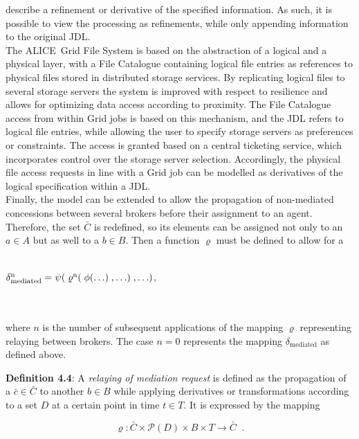 \documentclass[10pt]{iopart}
\newcommand{\alice}{ALICE}
\begin{document}
describe a refinement or derivative of the specified information. As such, it is
possible to view the processing as refinements, while only appending
information to the original JDL.\\
The \alice\ Grid File System is based on the abstraction of a
logical and a physical layer, with a File Catalogue containing
logical file entries as references to physical files stored in
distributed storage services. By replicating logical files to several 
storage servers the system is
improved with respect to resilience and allows for optimizing data access
according to
proximity. The
File Catalogue access from within Grid jobs is based on this mechanism, and the 
JDL refers to logical file entries,
while allowing the user to specify storage servers as preferences or
constraints. The access is granted based on a central ticketing service, which 
incorporates control over the storage server selection. Accordingly, the
physical file access requests in line with a Grid job can be modelled as
derivatives of the logical specification within a JDL.\\
Finally, the model can be extended to allow the propagation of
non-mediated concessions between several brokers before their assignment to an agent.
Therefore, the set $\bar{C}$ is
redefined, so its elements can be assigned not only to an $a \in A$  but as
well to a $b \in B$. Then a function $\varrho$ must be defined to
allow for a\\\\
\centerline{$\delta\rm{^n_{mediated}} =
\psi(\;\varrho^n(\;\phi(\ldots)\;,\ldots)\;,\ldots)$\;\;,}\\\\
where $n$ is the
number of subsequent applications of the mapping
$\varrho$ representing relaying between brokers. The case $n=0$ represents the
mapping $\delta_{\text{mediated}}$  as defined above.\\
\par
\begingroup
\leftskip=0.4cm \noindent
\textbf{Definition 4.4}: A \textit{relaying of mediation request} is defined as
the propagation of a $\bar{c} \in \bar{C}$ to another $ b \in B$ while applying
derivatives or transformations according to a set $D$ at a certain point in time
$t \in T$. It is expressed by the mapping
\par
\endgroup\noindent
\begin{center}
\begin{equation}\tag{f 4.4}\label{relay}\varrho: \bar{C}
\times \mathcal{P}(D) \times B \times T \rightarrow \bar{C}\;\;.\end{equation}
\end{center}
 
\end{document}
